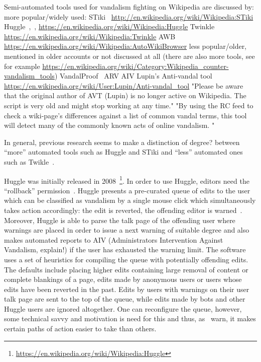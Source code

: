 Semi-automated tools used for vandalism fighting on Wikipedia are discussed by:
more popular/widely used:
STiki~\cite{WestKanLee2010}
\url{http://en.wikipedia.org/wiki/Wikipedia:STiki}
Huggle~\cite{GeiHal2013},~\cite{HalRied2012},\cite{GeiRib2010}
\url{https://en.wikipedia.org/wiki/Wikipedia:Huggle}
Twinkle
\url{https://en.wikipedia.org/wiki/Wikipedia:Twinkle}
AWB
\url{https://en.wikipedia.org/wiki/Wikipedia:AutoWikiBrowser}
less popular/older, mentioned in older accounts or not discussed at all (there are also more tools, see for example \url{https://en.wikipedia.org/wiki/Category:Wikipedia_counter-vandalism_tools})
VandalProof~\cite{HalRied2012}
ARV
AIV
Lupin's Anti-vandal tool~\cite{GeiRib2010}
\url{https://en.wikipedia.org/wiki/User:Lupin/Anti-vandal_tool}
"Please be aware that the original author of AVT (Lupin) is no longer active on Wikipedia. The script is very old and might stop working at any time."
"By using the RC feed to check a wiki-page's differences against a list of common vandal terms, this tool will detect many of the commonly known acts of online vandalism. "

In general, previous research seems to make a distinction of degree? between ``more'' automated tools such as Huggle and STiki and ``less'' automated ones such as Twikle~\cite{GeiHal2013}.

Huggle was initially released in 2008~\footnote{\url{https://en.wikipedia.org/wiki/Wikipedia:Huggle}}.
In order to use Huggle, editors need the ``rollback'' permission~\cite{HalRied2012}.
Huggle presents a pre-curated queue of edits to the user which can be classified as vandalism by a single mouse click which simultaneously takes action accordingly: the edit is reverted, the offending editor is warned~\cite{HalRied2012}.
Moreover, Huggle is able to parse the talk page of the offending user where warnings are placed in order to issue a next warning of suitable degree and also makes automated reports to AIV (Administrators Intervention Against Vandalism, explain!) if the user has exhausted the warning limit.
The software uses a set of heuristics for compiling the queue with potentially offending edits.
The defaults include placing higher edits containing large removal of content or complete blankings of a page, edits made by anonymous users or users whose edits have been reverted in the past.
Edits by users with warnings on their user talk page are sent to the top of the queue, while edits made by bots and other Huggle users are ignored altogether\cite{GeiRib2010}.
One can reconfigure the queue, however, some technical savvy and motivation is need for this and thus, as~\cite{GeiRib2010} warn, it makes certain paths of action easier to take than others.

